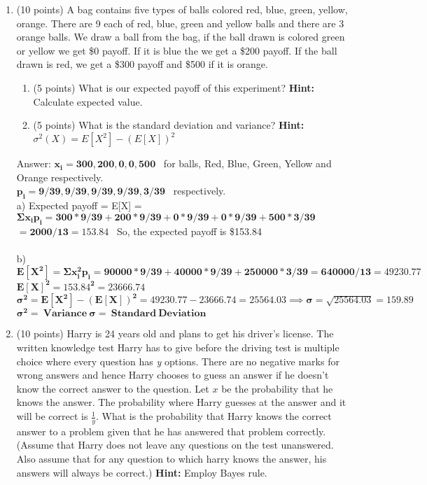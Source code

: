 \documentclass{article}%
\begin{document}
\begin{enumerate}
    \item (10 points) A bag contains five types of balls colored red, blue, green, yellow, orange. There are 9 each of red, blue, green and yellow balls and there are 3 orange balls. We draw a ball from the bag, if the ball drawn is colored green or yellow we get \$0 payoff. If it is blue the we get a \$200 payoff. If the ball drawn is red, we get a \$300 payoff and \$500 if it is orange.
    \begin{enumerate}
        \item (5 points) What is our expected payoff of this experiment? \textbf{Hint:} Calculate expected value.
        \item (5 points) What is the standard deviation and variance? \textbf{Hint:} $\sigma^2(X) = E[X^2] - (E[X])^2$
    \end{enumerate}

    Answer: $\mathbf{ x_i = 300, 200, 0, 0, 500 }$ \ for balls, Red, Blue, Green, Yellow and Orange respectively. \\
    $\mathbf{ p_i = 9/39, 9/39, 9/39, 9/39, 3/39 }$ \ respectively. \\
    a) Expected payoff = E[X] = $\mathbf{ \Sigma x_i p_i = 300 * 9/39 + 200 * 9/39 + 0 * 9/39 + 0 * 9/39 + 500 * 3/39}$ \\
    $\mathbf{ = 2000/13 = 153.84 }$ \ So, the expected payoff is \$153.84 \\ \\
    b) $\mathbf{ E[X^2] = \Sigma x_i ^2 p_i = 90000 * 9/39 + 40000 * 9/39 + 250000 * 3/39 = 640000 / 13 = 49230.77 }$ \\
    $\mathbf{ E[X]^2 = 153.84^2 = 23666.74 }$ \\
    $\mathbf{ \sigma ^2 = E[X^2] - (E[X])^2 = 49230.77 - 23666.74 = 25564.03 \implies \sigma = \sqrt{25564.03} = 159.89 }$ \\
    $\mathbf{ \sigma ^2 = \ Variance \ \sigma = \ Standard \ Deviation }$

    \item (10 points) Harry is 24 years old and plans to get his driver's license. The written knowledge test Harry has to give before the driving test is multiple choice where every question has \emph{y} options. There are no negative marks for wrong answers and hence Harry chooses to guess an answer if he doesn't know the correct answer to the question. Let $x$ be the probability that he knows the answer. The probability where Harry guesses at the answer and it will be correct is $\frac{1}{y}$. What is the probability that Harry knows the correct answer to a problem given that he has answered that problem correctly.
    (Assume that Harry does not leave any questions on the test unanswered. Also assume that for any question to which harry knows the answer, his answers will always be correct.) \textbf{Hint:} Employ Bayes rule.


\end{enumerate}
\end{document}

